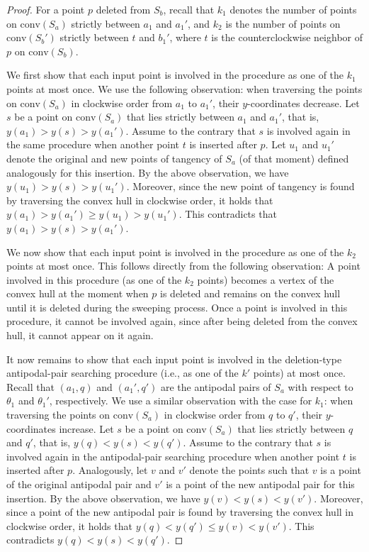 \documentclass[10pt,a4paper]{article}
\theoremstyle{star}
\theoremstyle{claimstar}
\newcommand{\conv}{\ensuremath{\mathrm{conv}}}
\begin{document}
\begin{proof}
    For a point $p$ deleted from $S_b$, recall that $k_1$ denotes the number of points on $\conv(S_a)$ strictly between $a_1$ and $a_1'$, and $k_2$ is the number of points on $\conv(S_b')$ strictly between $t$ and $b_1'$, where $t$ is the counterclockwise neighbor of $p$ on $\conv(S_b)$.

    We first show that each input point is involved in the procedure as one of the $k_1$ points at most once. 
    We use the following observation:
    when traversing the points on $\conv(S_a)$ in clockwise order from $a_1$ to $a_1'$, their $y$-coordinates decrease.
    Let $s$ be a point on $\conv(S_a)$ that lies strictly between $a_1$ and $a_1'$, that is, $y(a_1) > y(s) > y(a_1')$.
    Assume to the contrary that $s$ is involved again in the same procedure when another point $t$ is inserted after $p$.
    Let $u_1$ and $u_1'$ denote the original and new points of tangency of $S_a$ (of that moment) defined analogously for this insertion.
    By the above observation, we have $y(u_1) > y(s) > y(u_1')$.
    Moreover, since the new point of tangency is found by traversing the convex hull in clockwise order, 
    it holds that $y(a_1) > y(a_1') \ge y(u_1) > y(u_1')$.
    This contradicts that $y(a_1) > y(s) > y(a_1')$.

    We now show that each input point is involved in the procedure as one of the $k_2$ points at most once. This follows directly from the following observation:
    A point involved in this procedure (as one of the $k_2$ points) becomes a vertex of the convex hull at the moment when $p$ is deleted and remains on the convex hull until it is deleted during the sweeping process.
    Once a point is involved in this procedure, it cannot be involved again, since after being deleted from the convex hull, it cannot appear on it again.

    It now remains to show that each input point is involved in the deletion-type antipodal-pair searching procedure (i.e., as one of the $k'$ points) at most once.
    Recall that $(a_1, q)$ and $(a_1', q')$ are the antipodal pairs of $S_a$ with respect to $\theta_1$ and $\theta_1'$, respectively.
    We use a similar observation with the case for $k_1$: when traversing the points on $\conv(S_a)$ in clockwise order from $q$ to $q'$, their $y$-coordinates increase.
    Let $s$ be a point on $\conv(S_a)$ that lies strictly between $q$ and $q'$, that is, $y(q) < y(s) < y(q')$.
    Assume to the contrary that $s$ is involved again in the antipodal-pair searching procedure when another point $t$ is inserted after $p$.
    Analogously, let $v$ and $v'$ denote the points such that $v$ is a point of the original antipodal pair and $v'$ is a point of the new antipodal pair for this insertion.
    By the above observation, we have $y(v) < y(s) < y(v')$.
    Moreover, since a point of the new antipodal pair is found by traversing the convex hull in clockwise order, 
    it holds that $y(q) < y(q') \le y(v) < y(v')$.
    This contradicts $y(q) < y(s) < y(q')$.    
\end{proof}
\end{document}
